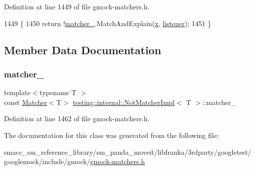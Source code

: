 Definition at line 1449 of file gmock-\/matchers.\+h.


\begin{DoxyCode}
1449                                                                          \{
1450     \textcolor{keywordflow}{return} !\hyperlink{classtesting_1_1internal_1_1NotMatcherImpl_a913c0244b28d9b9227a8a7353aedb648}{matcher\_}.MatchAndExplain(\hyperlink{namespaceinteractive__marker_acda52804aef30b460a72fb21ee01d69d}{x}, \hyperlink{namespaceinteractive__marker_a0e579ab555212bb5e2c9f8a675b7618a}{listener});
1451   \}
\end{DoxyCode}


\subsection{Member Data Documentation}
\mbox{\label{classtesting_1_1internal_1_1NotMatcherImpl_a913c0244b28d9b9227a8a7353aedb648}} 
\subsubsection{\texorpdfstring{matcher\+\_\+}{matcher\_}}
{\footnotesize\ttfamily template$<$typename T $>$ \\
const \hyperlink{classtesting_1_1Matcher}{Matcher}$<$T$>$ \hyperlink{classtesting_1_1internal_1_1NotMatcherImpl}{testing\+::internal\+::\+Not\+Matcher\+Impl}$<$ T $>$\+::matcher\+\_\+\hspace{0.3cm}{\ttfamily [private]}}



Definition at line 1462 of file gmock-\/matchers.\+h.



The documentation for this class was generated from the following file\+:\begin{DoxyCompactItemize}
\item 
smacc\+\_\+sm\+\_\+reference\+\_\+library/sm\+\_\+panda\+\_\+moveit/libfranka/3rdparty/googletest/googlemock/include/gmock/\hyperlink{gmock-matchers_8h}{gmock-\/matchers.\+h}\end{DoxyCompactItemize}
